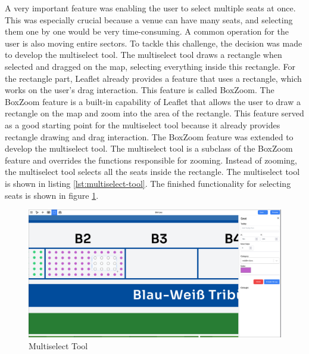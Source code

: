 A very important feature was enabling the user to select multiple seats at once. This was especially crucial because a venue can have many seats, and selecting them one by one would be very time-consuming. A common operation for the user is also moving entire sectors. To tackle this challenge, the decision was made to develop the multiselect tool. The multiselect tool draws a rectangle when selected and dragged on the map, selecting everything inside this rectangle. For the rectangle part, Leaflet already provides a feature that uses a rectangle, which works on the user's drag interaction. This feature is called BoxZoom. The BoxZoom feature is a built-in capability of Leaflet that allows the user to draw a rectangle on the map and zoom into the area of the rectangle. This feature served as a good starting point for the multiselect tool because it already provides rectangle drawing and drag interaction. The BoxZoom feature was extended to develop the multiselect tool. The multiselect tool is a subclass of the BoxZoom feature and overrides the functions responsible for zooming. Instead of zooming, the multiselect tool selects all the seats inside the rectangle. The multiselect tool is shown in listing \ref{lst:multiselect-tool}. The finished functionality for selecting seats is shown in figure \ref{fig:multiselect-tool}.
\begin{figure}
    \centering
    \includegraphics[scale=0.22]{pics/multiselect.png}
    \caption{Multiselect Tool}
    \label{fig:multiselect-tool}
\end{figure}


